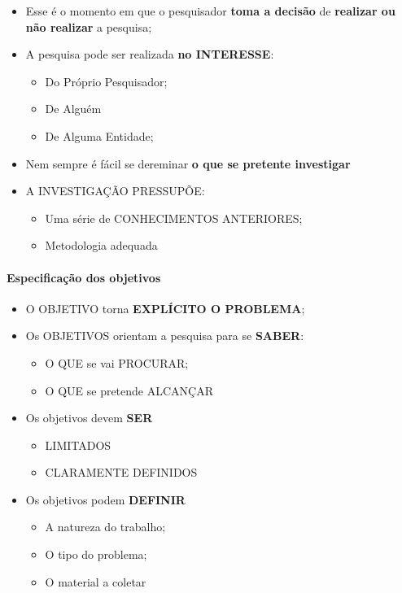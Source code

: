 \documentclass[
]{book}
\providecommand{\tightlist}{%
  \setlength{\itemsep}{0pt}\setlength{\parskip}{0pt}}
\begin{document}
\begin{itemize}
\tightlist
\item
  Esse é o momento em que o pesquisador \textbf{toma a decisão} de
  \textbf{realizar ou não realizar} a pesquisa;
\item
  A pesquisa pode ser realizada \textbf{no INTERESSE}:

  \begin{itemize}
  \tightlist
  \item
    Do Próprio Pesquisador;
  \item
    De Alguém
  \item
    De Alguma Entidade;
  \end{itemize}
\item
  Nem sempre é fácil se dereminar \textbf{o que se pretente investigar}
\item
  A INVESTIGAÇÃO PRESSUPÕE:

  \begin{itemize}
  \tightlist
  \item
    Uma série de CONHECIMENTOS ANTERIORES;
  \item
    Metodologia adequada
  \end{itemize}
\end{itemize}

\hypertarget{especificauxe7uxe3o-dos-objetivos}{%
\paragraph{Especificação dos
objetivos}\label{especificauxe7uxe3o-dos-objetivos}}

\begin{itemize}
\tightlist
\item
  O OBJETIVO torna \textbf{EXPLÍCITO O PROBLEMA};
\item
  Os OBJETIVOS orientam a pesquisa para se \textbf{SABER}:

  \begin{itemize}
  \tightlist
  \item
    O QUE se vai PROCURAR;
  \item
    O QUE se pretende ALCANÇAR
  \end{itemize}
\item
  Os objetivos devem \textbf{SER}

  \begin{itemize}
  \tightlist
  \item
    LIMITADOS
  \item
    CLARAMENTE DEFINIDOS
  \end{itemize}
\item
  Os objetivos podem \textbf{DEFINIR}

  \begin{itemize}
  \tightlist
  \item
    A natureza do trabalho;
  \item
    O tipo do problema;
  \item
    O material a coletar
  \end{itemize}
\end{itemize}
\end{document}
